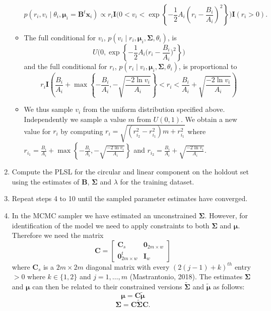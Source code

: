 \documentclass[12pt,]{article}
\begin{document}
\begin{enumerate}
\begin{itemize}
$$p(r_{i}, v_{i}\mid \theta_{i}, \boldsymbol{\mu}_{i}=\boldsymbol{B}^{t}\boldsymbol{x}_{i}) \propto r_{i} \textbf{I}\bigg(0 < v_i < \exp\left\{ -\frac{1}{2}A_i\left(r_{i} - \frac{B_i}{A_i}\right)^2\right\}\bigg)\textbf{I}(r_i > 0).$$
\item The full conditional for $v_{i}$, $p(v_{i} \mid r_{i},\boldsymbol{\mu}_{i}, \boldsymbol{\Sigma}, \theta_{i})$, is
$$U\Bigg(0, \exp\left\{-\frac{1}{2}A_i\bigg(r_i -  \frac{B_{i}}{A_i}\bigg)^2\right\}\Bigg)$$
and the full conditional for $r_i$, $p(r_{i} \mid v_{i},\boldsymbol{\mu}_{i}, \boldsymbol{\Sigma}, \theta_{i})$, is proportional to 
$$r_{i} \textbf{I}\left(\frac{B_i}{A_i} + \max\left\{-\frac{B_i}{A_i}, -\sqrt{\frac{-2\ln v_{i}}{A_i}}\right\} < r_{i} < \frac{B_i}{A_i} + \sqrt{\frac{-2\ln v_{i}}{A_i}}\right)$$
\item We thus sample $v_{i}$ from the uniform distribution specified above. Independently we sample a value $m$ from $U(0,1)$. We obtain a new value for $r_{i}$ by computing $r_{i} = \sqrt{(r_{i_{2}}^{2}-r_{i_{1}}^{2})m + r_{i_{1}}^{2}}$ where $r_{i_{1}}=\frac{B_i}{A_i} +\max\left\{-\frac{B_i}{A_i}, -\sqrt{\frac{-2\ln v_{i}}{A_i}}\right\}$ and $ r_{i_{2}}= \frac{B_i}{A_i} + \sqrt{\frac{-2\ln v_{i}}{A_i}}$.

\end{itemize}

\item Compute the PLSL for the circular and linear component on the holdout set using the estimates of $\boldsymbol{B}$, $\boldsymbol{\Sigma}$ and $\lambda$ for the training dataset.

\item Repeat steps 4 to 10 until the sampled parameter estimates have converged.

\item In the MCMC sampler we have estimated an unconstrained $\boldsymbol{\Sigma}$. However, for identification of the model we need to apply  constraints to both $\boldsymbol{\Sigma}$ and $\boldsymbol{\mu}$. Therefore we need the matrix
$$\boldsymbol{C} = \begin{bmatrix} \boldsymbol{C}_s & \boldsymbol{0}_{2m \times w} \\ \boldsymbol{0}_{2m \times w}^t & \boldsymbol{I}_w \end{bmatrix}$$
where $\boldsymbol{C}_s$ is a $2m \times 2m$ diagonal matrix with every $(2(j-1) + k)^{th}$ entry $> 0$ where $k \in \{1,2\}$ and $j = 1, \dots, m$ (Mastrantonio, 2018). The estimates $\boldsymbol{\Sigma}$ and $\boldsymbol{\mu}$ can then be related to their constrained versions $\tilde{\boldsymbol{\Sigma}}$ and $\tilde{\boldsymbol{\mu}}$ as follows:
$$\boldsymbol{\mu} = \boldsymbol{C}\tilde{\boldsymbol{\mu}}$$
$$\boldsymbol{\Sigma} = \boldsymbol{C}\tilde{\boldsymbol{\Sigma}}\boldsymbol{C}.$$

\end{enumerate}
\newpage
\end{document}
